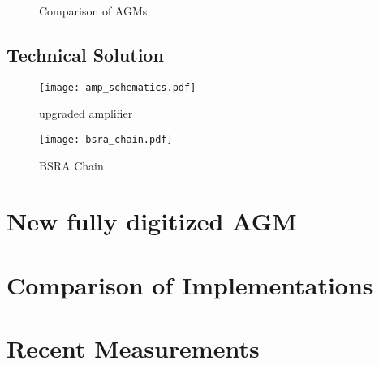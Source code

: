 
    \begin{figure}[!htb]
      \begin{center}
          \scalebox{0.54}{}
          \caption{Comparison of AGMs}
          \label{fig:comparison_chart}
      \end{center}
    \end{figure}


    \subsection{Technical Solution}
        \begin{figure*}[!tbh]
            \centering
            \texttt{[image: amp\_schematics.pdf]}
            \caption{upgraded amplifier}
            \label{fig:amplifier}
        \end{figure*}

        \begin{figure*}[!tbh]
            \centering
            \texttt{[image: bsra\_chain.pdf]}
            \caption{BSRA Chain}
            \label{fig:bsra_chain}
        \end{figure*}

\section{New fully digitized AGM}

\section{Comparison of Implementations}
     

\section{Recent Measurements}

